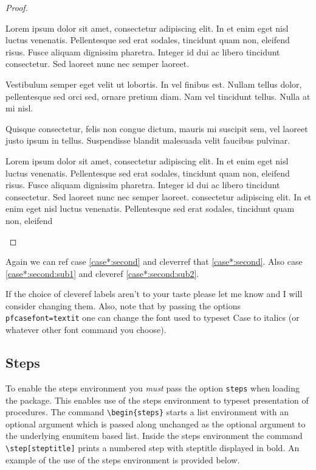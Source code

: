 \documentclass[leqno,11pt]{amsart}
\begin{document}
\begin{proof}
\begin{pfcases*}
\case[\( x = y \)]\label{case*:first}  Lorem ipsum dolor sit amet, consectetur adipiscing elit. In et enim eget nisl luctus venenatis. Pellentesque sed erat sodales, tincidunt quam non, eleifend risus. Fusce aliquam dignissim pharetra. Integer id dui ac libero tincidunt consectetur. Sed laoreet nunc nec semper laoreet. 

Vestibulum semper eget velit ut lobortis. In vel finibus est. Nullam tellus dolor, pellentesque sed orci sed, ornare pretium diam. Nam vel tincidunt tellus. Nulla at mi nisl. 

\case[\( x = z \land z > q \land z < r \land x + z = r \)] \label{case*:second} Quisque consectetur, felis non congue dictum, mauris mi suscipit sem, vel laoreet justo ipsum in tellus. Suspendisse blandit malesuada velit faucibus pulvinar. 
\begin{pfcases*}
\case[\( x=2 \)] \label{case*:second:sub1} Lorem ipsum dolor sit amet, consectetur adipiscing elit. In et enim eget nisl luctus venenatis. Pellentesque sed erat sodales, tincidunt quam non, eleifend risus. Fusce aliquam dignissim pharetra. Integer id dui ac libero tincidunt consectetur. Sed laoreet nunc nec semper laoreet. 
\case[\( x = 3 \)] \label{case*:second:sub2}  consectetur adipiscing elit. In et enim eget nisl luctus venenatis. Pellentesque sed erat sodales, tincidunt quam non, eleifend 
\end{pfcases*}
\end{pfcases*}
\end{proof}

Again we can ref case \ref{case*:second} and cleverref that \cref{case*:second}.  Also case \ref{case*:second:sub1} and cleveref \cref{case*:second:sub2}.



If the choice of cleveref labels aren't to your taste please let me know and I will consider changing them.  Also, note that by passing the options \verb!pfcasefont=textit! one can change the font used to typeset Case to italics (or whatever other font command you choose).

\subsection{Steps}
To enable the steps environment you \textit{must} pass the option \verb=steps= when loading the package.  This enables use of the steps environment to typeset presentation of procedures.  The command \verb=\begin{steps}= starts a list environment with an optional argument which is passed along unchanged as the optional argument to the underlying enumitem based list.  Inside the steps environment the command \verb=\step[steptitle]= prints a numbered step with steptitle displayed in bold. An example of the use of the steps environment is provided below.
\end{document}
